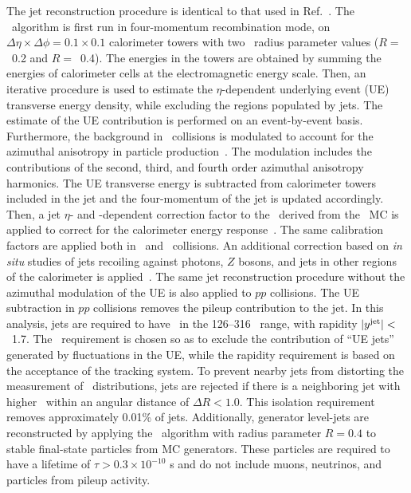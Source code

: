 
The jet reconstruction procedure is identical to that used in Ref.~\cite{2019108}.
The \antikt\ algorithm \cite{Cacciari:2008qp, Fastjet} is first run in four-momentum recombination mode, on $\Delta \eta \times \Delta \phi = 0.1\times 0.1$  calorimeter towers with two \antikt\ radius parameter values ($R=$~0.2 and $R=$~0.4).
The energies in the towers are obtained by summing the energies of calorimeter cells at the electromagnetic energy scale.
Then, an iterative procedure is used to estimate the $\eta$-dependent underlying event (UE)  transverse energy density, while excluding the regions populated by jets.
The estimate of the UE contribution is performed on an event-by-event basis.
Furthermore, the background in \pbpb\ collisions is modulated to account for the azimuthal anisotropy in particle production~\cite{ATLAS:2012at}.
The modulation includes the contributions of the second, third, and fourth order azimuthal anisotropy harmonics.
The UE transverse energy is subtracted from calorimeter towers included in the jet and the four-momentum of the jet is updated accordingly.
Then, a jet $\eta$- and \pT-dependent  correction factor to the \ptjet\ derived from the \pp\ MC is applied to correct for the calorimeter energy response~\cite{Aaboud:2017jcu}.
The same calibration factors are applied both in \pp\ and \pbpb\ collisions.
An additional correction based on \textit{in situ} studies of jets recoiling against photons, $Z$ bosons, and jets in other regions of the calorimeter is applied~\cite{ATL-PHYS-PUB-2015-036,2019167}.
The same jet reconstruction procedure without the azimuthal modulation of the UE is also applied to $pp$ collisions.
The UE subtraction in $pp$ collisions removes the pileup contribution to the jet.
In this analysis, jets are required to have \ptjet\ in the 126--316 \GeV\ range, with rapidity  $|\mbox{$y^{\mathrm{jet}}$}|<$~1.7.
The \ptjet\ requirement is chosen so as to exclude the contribution of ``UE jets'' generated by fluctuations in the UE, while the rapidity requirement is based on the acceptance of the tracking system.	  
To prevent nearby jets from distorting the measurement of \Dptr\ distributions, jets are rejected if there is a neighboring jet with higher \ptjet\ within an angular distance of $\Delta R < 1.0$.
This isolation requirement removes approximately 0.01\% of jets.
Additionally, generator level-jets are reconstructed by applying the \antikt\ algorithm with radius parameter $R=0.4$ to stable final-state particles from MC generators.
These particles are required to have a lifetime of $\tau>0.3\times 10^{-10}$ s and do not include muons, neutrinos, and particles from pileup activity.

